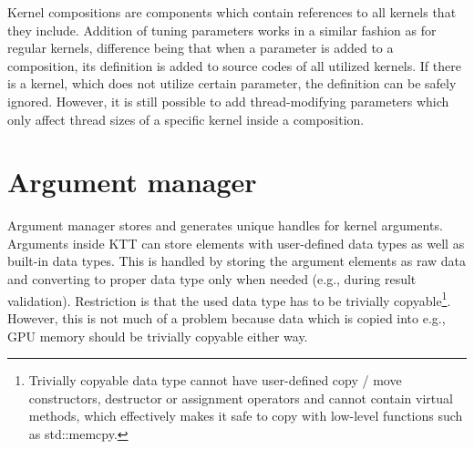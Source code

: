 \documentclass
[
    digital, %
    oneside, %
    table, %
    nolof, %
    nolot, %
    nocover %
]{fithesis3}
\begin{document}
Kernel compositions are components which contain references to all kernels that they include. Addition of tuning parameters works in a similar fashion
as for regular kernels, difference being that when a parameter is added to a composition, its definition is added to source codes of all utilized kernels.
If there is a kernel, which does not utilize certain parameter, the definition can be safely ignored. However, it is still possible to add thread-modifying
parameters which only affect thread sizes of a specific kernel inside a composition.

\section{Argument manager}
Argument manager stores and generates unique handles for kernel arguments. Arguments inside KTT can store elements with user-defined data types as well as
built-in data types. This is handled by storing the argument elements as raw data and converting to proper data type only when needed (e.g., during result
validation). Restriction is that the used data type has to be trivially copyable\footnote{Trivially copyable data type cannot have user-defined
copy / move constructors, destructor or assignment operators and cannot contain virtual methods, which effectively makes it safe to copy with low-level
functions such as std::memcpy.}. However, this is not much of a problem because data which is copied into e.g., GPU memory should be trivially copyable
either way.
\end{document}
